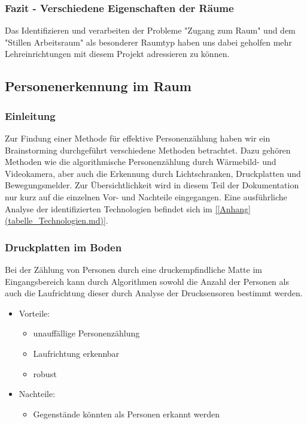 \subsubsection{Fazit - Verschiedene Eigenschaften der Räume}
\label{sec:Fazit_Verschiedene_Eigenschaften_der_Räume}

Das Identifizieren und verarbeiten der Probleme "Zugang zum Raum" und dem
"Stillen Arbeitsraum" als besonderer Raumtyp haben uns dabei geholfen mehr
Lehreinrichtungen mit diesem Projekt adressieren zu können.


\subsection{Personenerkennung im Raum}
\label{sec:Personenerkennung_im_Raum}

\subsubsection{Einleitung}
\label{sec:Personenerkennung_im_Raum_Einleitung}

Zur Findung einer Methode für effektive Personenzählung haben wir ein
Brainstorming durchgeführt verschiedene Methoden betrachtet. Dazu gehören 
Methoden wie die algorithmische Personenzählung
durch Wärmebild- und Videokamera, aber auch die Erkennung durch Lichtschranken,
Druckplatten und Bewegungsmelder.
Zur Übersichtlichkeit wird in diesem Teil der Dokumentation nur kurz auf die
einzelnen Vor- und Nachteile eingegangen. Eine ausführliche Analyse der
identifizierten Technologien befindet sich im \ref{[Anhang](tabelle_Technologien.md)}.

\subsubsection{Druckplatten im Boden}
\label{sec:Druckplatten_im_Boden}

Bei der Zählung von Personen durch eine druckempfindliche Matte im
Eingangsbereich kann durch Algorithmen sowohl die Anzahl der Personen als auch
die Laufrichtung dieser durch Analyse der Drucksensoren bestimmt werden.

\begin{itemize}
	\item Vorteile:
	\begin{itemize}
		\item unauffällige Personenzählung
		\item Laufrichtung erkennbar
		\item robust
	\end{itemize}
	\item Nachteile:
	\begin{itemize}
		\item Gegenstände könnten als Personen erkannt werden
	\end{itemize}
\end{itemize}


